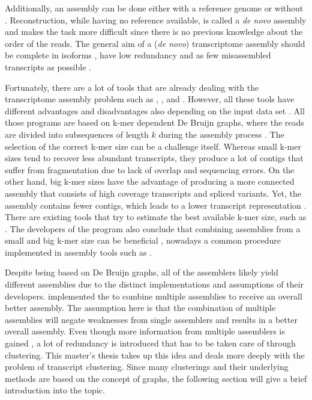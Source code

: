 \documentclass[12pt,a4paper,english]{article}
\begin{document}
    Additionally, an assembly can be done either with a reference genome or without \citep{transcriptome_misassemblies:11}. Reconstruction, while having no reference available, is called a \textit{de novo} assembly and makes the task more difficult since there is no previous knowledge about the order of the reads.
    The general aim of a (\textit{de novo}) transcriptome assembly should be complete in isoforms \citep{transcriptome_isoforms:18}, have low redundancy \citep{transcriptome_redundancy:15} and as few misassembled transcripts as possible \citep{transcriptome_misassemblies:11}. 
    
    Fortunately, there are a lot of tools that are already dealing with the transcriptome assembly problem such as \soap \citep{SOAPdenovo-Trans:14}, \trinity \citep{Trinity:11}, \transabyss \citep{Trans-ABySS:10} and \spades \citep{rnaSPAdes:18}. However, all these tools have different advantages and disadvantages also depending on the input data set \citep{hoelzer:19}. All those programs are based on k-mer dependent De Bruijn graphs, where the reads are divided into subsequences of length $k$ during the assembly process \citep{rev_bruijn:11}. The selection of the correct k-mer size can be a challenge itself. Whereas small k-mer sizes tend to recover less abundant transcripts, they produce a lot of contigs that suffer from fragmentation due to lack of overlap and sequencing errors. On the other hand, big k-mer sizes have the advantage of producing a more connected assembly that consists of high coverage transcripts and spliced variants. Yet, the assembly contains fewer contigs, which leads to a lower transcript representation \citep{Rana:16}. There are existing tools that try to estimate the best available k-mer size, such as \kmergenie \citep{kmerGenie:13}. The developers of the program also conclude that combining assemblies from a small and big k-mer size can be beneficial \citep{kmerGenie:13}, nowadays a common procedure implemented in assembly tools such as \spades \citep{rnaSPAdes:18}.
    
    Despite being based on De Bruijn graphs, all of the assemblers likely yield different assemblies due to the distinct implementations and assumptions of their developers. \citeauthor{OysterRiverProtocol:18} implemented the \orp \citep{OysterRiverProtocol:18} to combine multiple assemblies to receive an overall better assembly. The assumption here is that the combination of multiple assemblies will negate weaknesses from single assemblers and results in a better overall assembly. Even though more information from multiple assemblers is gained \citep{hoelzer:19}, a lot of redundancy is introduced that has to be taken care of through clustering.
    This master's thesis takes up this idea and deals more deeply with the problem of transcript clustering.
    Since many clusterings and their underlying methods are based on the concept of graphs, the following section will give a brief introduction into the topic.
	
\end{document}

